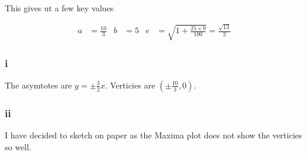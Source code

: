 \documentclass{article}
\begin{document}
This gives ut a few key values

\begin{align*}
	a & = \frac {10}3 & b & = 5 & e & = \sqrt {1 + \frac {25\times9}{100}} = \frac {\sqrt{13}}{2}
\end{align*}

\subsubsection {i}

The asymtotes are $y = \pm \frac {3} {2}x$. Verticies are $(\pm \frac {10}3, 0)$.

\subsubsection {ii}

I have decided to sketch on paper as the Maxima plot does not show the verticies so well.
\end{document}
